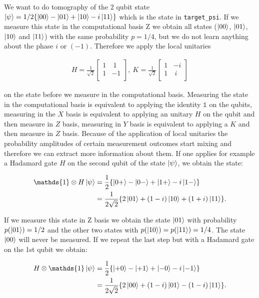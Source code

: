 \documentclass[submission, Phys]{SciPost}
\begin{document}
We want to do tomography of the 2 qubit state $\ket{\psi} = 1/2 \{ \ket{00} - \ket{01} + \ket{10} - i \ket{11} \}$ which is the state in \verb|target_psi|. If we measure this state in the computational basis Z we obtain all states ($\ket{00}$, $\ket{01}$, $\ket{10}$ and $\ket{11}$) with the same probability $p = 1/4$, but we do not learn anything about the phase $i$ or $(-1)$. Therefore we apply the local unitaries

\begin{align}
H = \frac{1}{\sqrt{2}} 
\begin{bmatrix}
1 &~1 \\
1 &-1 \\ 
\end{bmatrix},~
K = \frac{1}{\sqrt{2}} 
\begin{bmatrix}
1 &-i \\
1 &~i \\ 
\end{bmatrix}
\end{align} 

 on the state before we measure in the computational basis. Measuring the state in the computational basis is equivalent to applying the identity $\mathds{1}$ on the qubits, measuring in the $X$ basis is equivalent to applying an unitary $H$ on the qubit and then measure in $Z$ basis, measuring in $Y$ basis is equivalent to applying a $K$ and then measure in $Z$ basis. Because of the application of local unitaries the probability amplitudes of certain measurement outcomes start mixing and therefore we can extract more information about them.  If one applies for example a Hadamard gate $H$ on the second qubit of the state $\ket{\psi}$, we obtain the state:

\begin{align}
\mathds{1} \otimes H \ket{\psi} &= \frac{1}{2} \{ \ket{0+} - \ket{0-} + \ket{1+} - i \ket{1-} \} \\
&=  \frac{1}{2 \sqrt{2}} \{ 2 \ket{01} + (1-i)\ket{10} + (1+i)\ket{11} \}. 
\end{align}

If we measure this state in Z basis we obtain the state $\ket{01}$ with probability $p(\ket{01}) = 1/2$ and the other two states with $p(\ket{10}) = p(\ket{11}) = 1/4$. The state $\ket{00}$ will never be measured. If we repeat the last step but with a Hadamard gate on the 1st qubit we obtain:

\begin{align}
H  \otimes \mathds{1} \ket{\psi} &= \frac{1}{2} \{ \ket{+0} - \ket{+1} + \ket{-0} - i \ket{-1} \} \\
&=  \frac{1}{2 \sqrt{2}} \{ 2 \ket{00} + (1-i)\ket{01} - (1-i)\ket{11} \}. 
\end{align}
\end{document}
